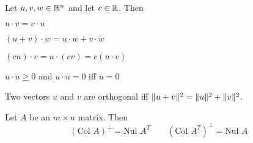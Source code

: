 \begin{card}
    \begin{theorem}
    Let $u,v,w \in \mathbb{R}^n$ and let $c \in \mathbb{R}$. Then
    \begin{compactenum}
    \item $u \cdot v = v \cdot u$
    \item $(u + v) \cdot w = u \cdot w + v \cdot w$
    \item $(cu)\cdot v = u \cdot (cv) = c(u \cdot v)$
    \item $u \cdot u \geq 0$ and $u \cdot u = 0$ iff $u = 0$
    \end{compactenum}
    \end{theorem}

    \begin{theorem}
    Two vectors $u$ and $v$ are orthogonal iff
    $\lVert u + v\rVert^2 = \lVert u\rVert^2 + \lVert v\rVert^2$.
    \end{theorem}

    \begin{theorem}
    Let $A$ be an $m \times n$ matrix. Then
        $$ (\text{Col } A)^\bot = \text{Nul } A^T
    \qquad (\text{Col } A^T)^\bot = \text{Nul } A $$
    \end{theorem}


\end{card}


